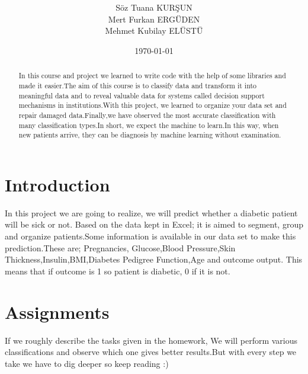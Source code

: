 \documentclass[onecolumn]{article}
\title{\spacecaps{FINAL PROJECT:DIABETES }\\ \normalsize \spacesc{CENG 3521, Data Mining} }
\author{Söz Tuana KURŞUN\\Mert Furkan ERGÜDEN\\Mehmet Kubilay ELÜSTÜ\\}
\date{\today}
\begin{document}
\maketitle

\begin{abstract}
In this course and project we learned to write code with the help of some libraries and made it easier.The aim of this course is to classify data and transform it into meaningful data and to reveal valuable data for systems called decision support mechanisms in institutions.With this project, we learned to organize your data set and repair damaged data.Finally,we have observed the most accurate classification with many classification types.In short, we expect the machine to learn.In this way, when new patients arrive, they can be diagnosis by machine learning without examination.
\end{abstract}


\section{Introduction}
In this project we are going to realize, we will predict whether a diabetic patient will be sick or not. Based on the data kept in Excel; it is aimed to segment, group and organize patients.Some information is available in our data set to make this prediction.These are; Pregnancies,	Glucose,Blood Pressure,Skin Thickness,Insulin,BMI,Diabetes Pedigree Function,Age and outcome output. This means that if outcome is 1 so patient is diabetic, 0 if it is not.


\section{Assignments}
If we roughly describe the tasks given in the homework, We will perform various classifications and observe which one gives better results.But with every step we take we have to dig deeper so keep reading :)
\end{document}
